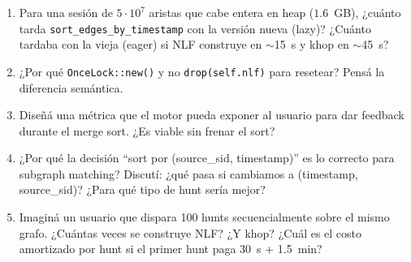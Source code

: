 \begin{ejercicios}
\begin{enumerate}
    \item \starred{} Para una sesión de $5 \cdot 10^7$ aristas que
    cabe entera en heap ($1.6$~GB), ¿cuánto tarda
    \texttt{sort\_edges\_by\_timestamp} con la versión nueva
    (lazy)? ¿Cuánto tardaba con la vieja (eager) si NLF construye en
    $\sim$15~s y khop en $\sim$45~s?

    \item ¿Por qué \texttt{OnceLock::new()} y no
    \texttt{drop(self.nlf)} para resetear? Pensá la diferencia
    semántica.

    \item \starred{} Diseñá una métrica que el motor pueda exponer
    al usuario para dar feedback durante el merge sort. ¿Es viable
    sin frenar el sort?

    \item ¿Por qué la decisión ``sort por (source\_sid, timestamp)''
    es lo correcto para subgraph matching? Discutí: ¿qué pasa si
    cambiamos a (timestamp, source\_sid)? ¿Para qué tipo de hunt
    sería mejor?

    \item Imaginá un usuario que dispara 100 hunts secuencialmente
    sobre el mismo grafo. ¿Cuántas veces se construye NLF? ¿Y
    khop? ¿Cuál es el costo amortizado por hunt si el primer hunt
    paga 30~s + 1.5~min?
\end{enumerate}
\end{ejercicios}

